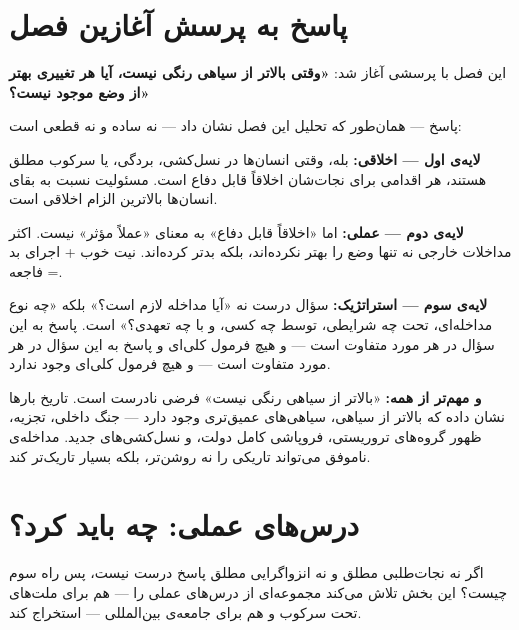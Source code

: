\section{پاسخ به پرسش آغازین فصل}
\label{sec:ch15-answering-question}

این فصل با پرسشی آغاز شد: \textbf{«وقتی بالاتر از سیاهی رنگی نیست، آیا هر تغییری بهتر از وضع موجود نیست؟»}

پاسخ — همان‌طور که تحلیل این فصل نشان داد — نه ساده و نه قطعی است:

\begin{tcolorbox}[quotebox, title={پاسخ سه‌لایه}]
\textbf{لایه‌ی اول — اخلاقی:} بله، وقتی انسان‌ها در نسل‌کشی، بردگی، یا سرکوب مطلق هستند، هر اقدامی برای نجات‌شان اخلاقاً قابل دفاع است. مسئولیت نسبت به بقای انسان‌ها بالاترین الزام اخلاقی است.

\textbf{لایه‌ی دوم — عملی:} اما «اخلاقاً قابل دفاع» به معنای «عملاً مؤثر» نیست. اکثر مداخلات خارجی نه تنها وضع را بهتر نکرده‌اند، بلکه بدتر کرده‌اند. نیت خوب + اجرای بد = فاجعه.

\textbf{لایه‌ی سوم — استراتژیک:} سؤال درست نه «آیا مداخله لازم است؟» بلکه «چه نوع مداخله‌ای، تحت چه شرایطی، توسط چه کسی، و با چه تعهدی؟» است. پاسخ به این سؤال در هر مورد متفاوت است — و هیچ فرمول کلی‌ای و
پاسخ به این سؤال در هر مورد متفاوت است — و هیچ فرمول کلی‌ای وجود ندارد.

\textbf{و مهم‌تر از همه:} «بالاتر از سیاهی رنگی نیست» فرضی نادرست است. تاریخ بارها نشان داده که بالاتر از سیاهی، سیاهی‌های عمیق‌تری وجود دارد — جنگ داخلی، تجزیه، ظهور گروه‌های تروریستی، فروپاشی کامل دولت، و نسل‌کشی‌های جدید. مداخله‌ی ناموفق می‌تواند تاریکی را نه روشن‌تر، بلکه بسیار تاریک‌تر کند.
\end{tcolorbox}


\section{درس‌های عملی: چه باید کرد؟}
\label{sec:ch15-practical-lessons}

اگر نه نجات‌طلبی مطلق و نه انزواگرایی مطلق پاسخ درست نیست، پس راه سوم چیست؟ این بخش تلاش می‌کند مجموعه‌ای از درس‌های عملی را — هم برای ملت‌های تحت سرکوب و هم برای جامعه‌ی بین‌المللی — استخراج کند.

